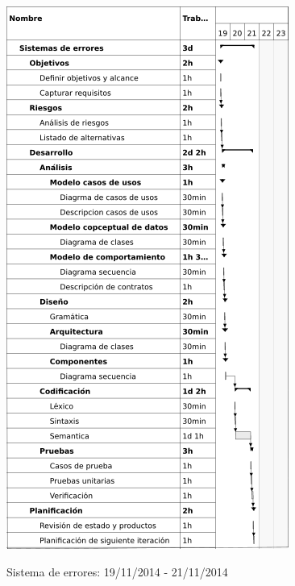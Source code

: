 \begin{center}
\begin{figure}[H]
\centering
\includegraphics[scale=1]{planning/4-sistema-errores.png} \\
\caption{Sistema de errores: 19/11/2014 - 21/11/2014 }
\end{figure}
\end{center}

